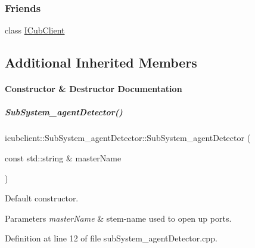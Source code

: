 \subsubsection*{Friends}
\begin{DoxyCompactItemize}
\item 
class \hyperlink{group__icubclient__subsystems_a56c42753f30380d8abf4a96bc322b3b0}{I\+Cub\+Client}
\end{DoxyCompactItemize}
\subsection*{Additional Inherited Members}


\paragraph{Constructor \& Destructor Documentation}
\mbox{\label{group__icubclient__subsystems_a8f9347c9a72e6e7278bb4e03f74720df}} 
\subparagraph{\texorpdfstring{Sub\+System\+\_\+agent\+Detector()}{SubSystem\_agentDetector()}}
{\footnotesize\ttfamily icubclient\+::\+Sub\+System\+\_\+agent\+Detector\+::\+Sub\+System\+\_\+agent\+Detector (\begin{DoxyParamCaption}\item[{const std\+::string \&}]{master\+Name }\end{DoxyParamCaption})}



Default constructor. 


\begin{DoxyParams}{Parameters}
{\em master\+Name} & stem-\/name used to open up ports. \\
\hline
\end{DoxyParams}


Definition at line 12 of file sub\+System\+\_\+agent\+Detector.\+cpp.



